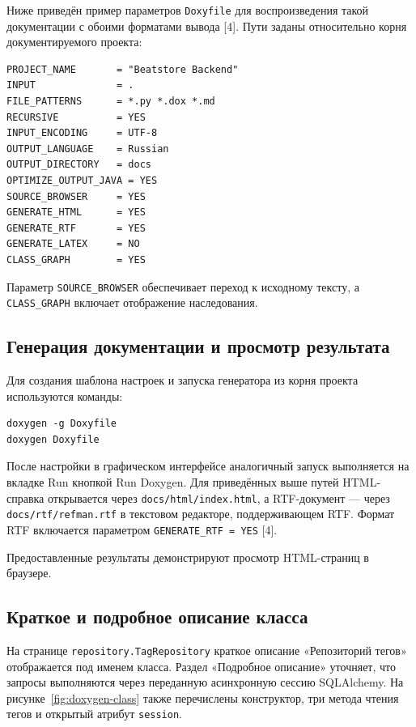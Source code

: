 Ниже приведён пример параметров \texttt{Doxyfile} для воспроизведения
такой документации с обоими форматами вывода [4].
Пути заданы относительно корня документируемого проекта:

\begingroup
\small
\begin{verbatim}
PROJECT_NAME       = "Beatstore Backend"
INPUT              = .
FILE_PATTERNS      = *.py *.dox *.md
RECURSIVE          = YES
INPUT_ENCODING     = UTF-8
OUTPUT_LANGUAGE    = Russian
OUTPUT_DIRECTORY   = docs
OPTIMIZE_OUTPUT_JAVA = YES
SOURCE_BROWSER     = YES
GENERATE_HTML      = YES
GENERATE_RTF       = YES
GENERATE_LATEX     = NO
CLASS_GRAPH        = YES
\end{verbatim}
\endgroup

Параметр \verb|SOURCE_BROWSER| обеспечивает переход к исходному тексту,
а \verb|CLASS_GRAPH| включает отображение наследования.

\subsection{Генерация документации и просмотр результата}

Для создания шаблона настроек и запуска генератора из корня проекта
используются команды:

\begingroup
\small
\begin{verbatim}
doxygen -g Doxyfile
doxygen Doxyfile
\end{verbatim}
\endgroup

После настройки в графическом интерфейсе аналогичный запуск выполняется
на вкладке Run кнопкой Run Doxygen. Для приведённых выше путей HTML-справка
открывается через \texttt{docs/html/index.html}, а RTF-документ ---
через \texttt{docs/rtf/refman.rtf} в текстовом редакторе, поддерживающем RTF.
Формат RTF включается параметром \verb|GENERATE_RTF = YES| [4].

Предоставленные результаты демонстрируют просмотр HTML-страниц в браузере.

\subsection{Краткое и подробное описание класса}

На странице \texttt{repository.TagRepository} краткое описание
«Репозиторий тегов» отображается под именем класса.
Раздел «Подробное описание» уточняет, что запросы выполняются через
переданную асинхронную сессию SQLAlchemy.
На рисунке~\ref{fig:doxygen-class} также перечислены конструктор,
три метода чтения тегов и открытый атрибут \texttt{session}.

